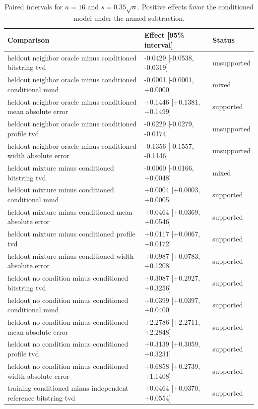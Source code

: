 \begin{table}[p]
\centering
\scriptsize
\setlength{\tabcolsep}{4pt}
\caption{Paired intervals for $n=16$ and $s=0.35\sqrt n$. Positive effects favor the conditioned model under the named subtraction.}
\label{tab:all-intervals-n16-w0.35}
\begin{tabular}{@{}p{}p{}p{}@{}}
\toprule
Comparison & Effect [95\% interval] & Status\\
\midrule
heldout neighbor oracle minus conditioned bitstring tvd & -0.0429 [-0.0538, -0.0319] & unsupported \\
heldout neighbor oracle minus conditioned conditional mmd & -0.0001 [-0.0001, +0.0000] & mixed \\
heldout neighbor oracle minus conditioned mean absolute error & +0.1446 [+0.1381, +0.1499] & supported \\
heldout neighbor oracle minus conditioned profile tvd & -0.0229 [-0.0279, -0.0174] & unsupported \\
heldout neighbor oracle minus conditioned width absolute error & -0.1356 [-0.1557, -0.1146] & unsupported \\
heldout mixture minus conditioned bitstring tvd & -0.0060 [-0.0166, +0.0048] & mixed \\
heldout mixture minus conditioned conditional mmd & +0.0004 [+0.0003, +0.0005] & supported \\
heldout mixture minus conditioned mean absolute error & +0.0464 [+0.0369, +0.0546] & supported \\
heldout mixture minus conditioned profile tvd & +0.0117 [+0.0067, +0.0172] & supported \\
heldout mixture minus conditioned width absolute error & +0.0987 [+0.0783, +0.1208] & supported \\
heldout no condition minus conditioned bitstring tvd & +0.3087 [+0.2927, +0.3256] & supported \\
heldout no condition minus conditioned conditional mmd & +0.0399 [+0.0397, +0.0400] & supported \\
heldout no condition minus conditioned mean absolute error & +2.2786 [+2.2711, +2.2848] & supported \\
heldout no condition minus conditioned profile tvd & +0.3139 [+0.3059, +0.3231] & supported \\
heldout no condition minus conditioned width absolute error & +0.6858 [+0.2739, +1.1408] & supported \\
training conditioned minus independent reference bitstring tvd & +0.0464 [+0.0370, +0.0554] & supported \\

\end{tabular}
\end{table}
